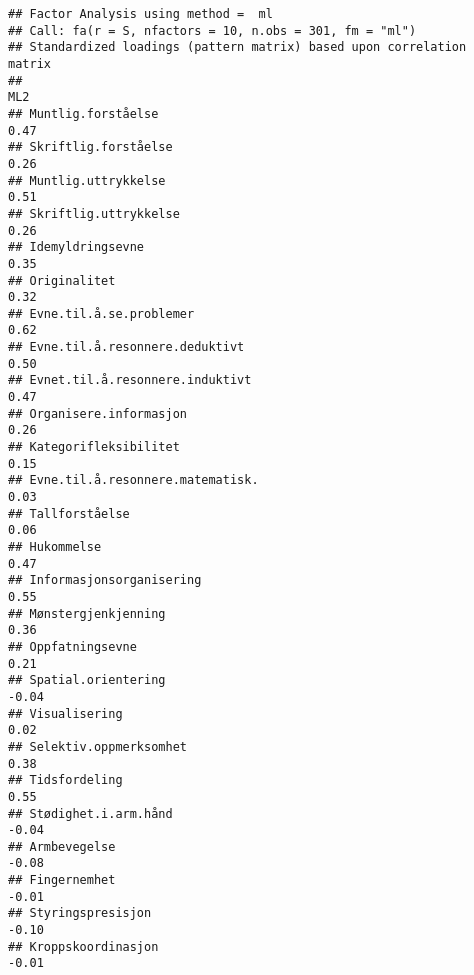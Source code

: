 \documentclass[
]{article}
\begin{document}
\begin{verbatim}
## Factor Analysis using method =  ml
## Call: fa(r = S, nfactors = 10, n.obs = 301, fm = "ml")
## Standardized loadings (pattern matrix) based upon correlation matrix
##                                                                                    ML2
## Muntlig.forståelse                                                                0.47
## Skriftlig.forståelse                                                              0.26
## Muntlig.uttrykkelse                                                               0.51
## Skriftlig.uttrykkelse                                                             0.26
## Idemyldringsevne                                                                  0.35
## Originalitet                                                                      0.32
## Evne.til.å.se.problemer                                                           0.62
## Evne.til.å.resonnere.deduktivt                                                    0.50
## Evnet.til.å.resonnere.induktivt                                                   0.47
## Organisere.informasjon                                                            0.26
## Kategorifleksibilitet                                                             0.15
## Evne.til.å.resonnere.matematisk.                                                  0.03
## Tallforståelse                                                                    0.06
## Hukommelse                                                                        0.47
## Informasjonsorganisering                                                          0.55
## Mønstergjenkjenning                                                               0.36
## Oppfatningsevne                                                                   0.21
## Spatial.orientering                                                              -0.04
## Visualisering                                                                     0.02
## Selektiv.oppmerksomhet                                                            0.38
## Tidsfordeling                                                                     0.55
## Stødighet.i.arm.hånd                                                             -0.04
## Armbevegelse                                                                     -0.08
## Fingernemhet                                                                     -0.01
## Styringspresisjon                                                                -0.10
## Kroppskoordinasjon                                                               -0.01

\end{verbatim}
\end{document}
